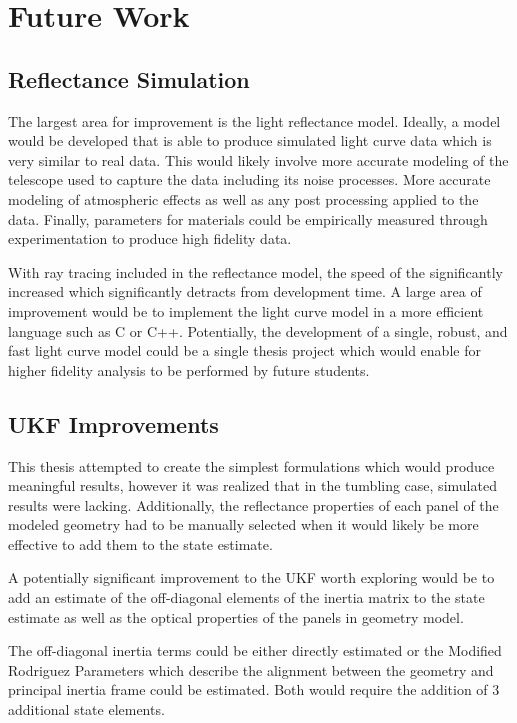 \chapter{Future Work}

\section{Reflectance Simulation}
The largest area for improvement is the light reflectance model. Ideally, a model would be developed that is able to produce simulated light curve data which is very similar to real data. This would likely involve more accurate modeling of the telescope used to capture the data including its noise processes. More accurate modeling of atmospheric effects as well as any post processing applied to the data. Finally, parameters for materials could be empirically measured through experimentation to produce high fidelity data.

With ray tracing included in the reflectance model, the speed of the significantly increased which significantly detracts from development time. A large area of improvement would be to implement the light curve model in a more efficient language such as C or C++. Potentially, the development of a single, robust, and fast light curve model could be a single thesis project which would enable for higher fidelity analysis to be performed by future students.

\section{UKF Improvements}

This thesis attempted to create the simplest formulations which would produce meaningful results, however it was realized that in the tumbling case, simulated results were lacking. Additionally, the reflectance properties of each panel of the modeled geometry had to be manually selected when it would likely be more effective to add them to the state estimate. 

A potentially significant improvement to the UKF worth exploring would be to add an estimate of the off-diagonal elements of the inertia matrix to the state estimate as well as the optical properties of the panels in geometry model.

The off-diagonal inertia terms could be either directly estimated or the Modified Rodriguez Parameters which describe the alignment between the geometry and principal inertia frame could be estimated. Both would require the addition of 3 additional state elements.

